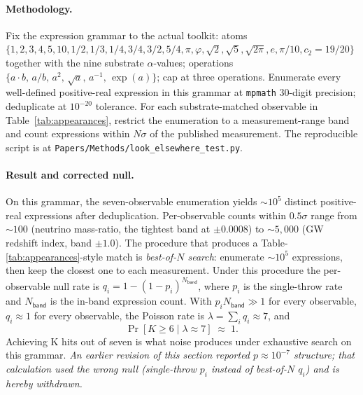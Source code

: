 \documentclass[11pt,a4paper]{amsart}
\theoremstyle{plain}
\theoremstyle{definition}
\begin{document}
\paragraph{Methodology.} Fix the expression grammar to the actual toolkit: atoms $\{1, 2, 3, 4, 5, 10, 1/2, 1/3, 1/4, 3/4, 3/2, 5/4, \pi, \varphi, \sqrt{2}, \sqrt{5}, \sqrt{2\pi}, e, \pi/10, c_2 = 19/20\}$ together with the nine substrate $\alpha$-values; operations $\{a\!\cdot\! b,\, a/b,\, a^2,\, \sqrt{a},\, a^{-1},\, \exp(a)\}$; cap at three operations. Enumerate every well-defined positive-real expression in this grammar at \texttt{mpmath} 30-digit precision; deduplicate at $10^{-20}$ tolerance. For each substrate-matched observable in Table~\ref{tab:appearances}, restrict the enumeration to a measurement-range band and count expressions within $N\sigma$ of the published measurement. The reproducible script is at \texttt{Papers/Methods/look\_elsewhere\_test.py}.

\paragraph{Result and corrected null.} On this grammar, the seven-observable enumeration yields $\sim 10^5$ distinct positive-real expressions after deduplication. Per-observable counts within $0.5\sigma$ range from $\sim 100$ (neutrino mass-ratio, the tightest band at $\pm 0.0008$) to $\sim 5{,}000$ (GW redshift index, band $\pm 1.0$). The procedure that produces a Table-\ref{tab:appearances}-style match is \emph{best-of-$N$ search}: enumerate $\sim 10^5$ expressions, then keep the closest one to each measurement. Under this procedure the per-observable null rate is $q_i = 1 - (1 - p_i)^{N_{\textsf{band}}}$, where $p_i$ is the single-throw rate and $N_{\textsf{band}}$ is the in-band expression count. With $p_i N_{\textsf{band}} \gg 1$ for every observable, $q_i \approx 1$ for every observable, the Poisson rate is $\lambda = \sum_i q_i \approx 7$, and
\[
\Pr[K \geq 6 \mid \lambda \approx 7] \;\approx\; 1.
\]
Achieving K hits out of seven is what noise produces under exhaustive search on this grammar. \emph{An earlier revision of this section reported $p \approx 10^{-7}$ structure; that calculation used the wrong null (single-throw $p_i$ instead of best-of-$N$ $q_i$) and is hereby withdrawn.}
\end{document}
